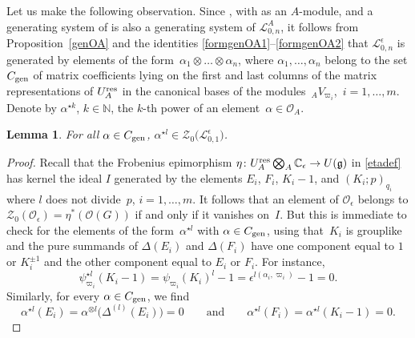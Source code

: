 \documentclass[pdftex]{sigma}
\numberwithin{equation}{section}
\newtheorem{lem}[teo]{Lemma}
\theoremstyle{definition}
\newcommand{\e}{\epsilon}
\newcommand{\mc}{\mathbb{C}}
\newcommand{\Ll}{{\mathcal L}}
\newcommand{\Oo}{{\mathcal O}}
\newcommand{\ra}{\rightarrow}
\begin{document}
Let us make the following observation. Since \smash{$\Ll_{0,n}^\e = \Ll_{0,n}^A \bigotimes_A \mc_\e$}, with \smash{$\Ll_{0,n}^A = \Oo_A^{\otimes n}$} as an $A$-module, and a generating system of \smash{$\Oo_A^{\otimes n}$} is also a generating system of $\Ll_{0,n}^A$, it follows from Proposition~\ref{genOA} and the identities \eqref{formgenOA1}--\eqref{formgenOA2} that $\Ll_{0,n}^\e$ is generated by elements of the form~${\alpha_1 \otimes \dots \otimes \alpha_n}$, where $\alpha_1,\dots , \alpha_n$ belong to the set $C_{\rm gen}$ of matrix coefficients lying on the first and last columns of the matrix representations of $U_A^{\rm res}$ in the canonical bases of the modules~${{}_AV_{\varpi_i}}$,~$i=1,\dots, m$. Denote by $\alpha^{\star k}$, $k\in \mathbb{N}$, the $k$-th power of an element~${\alpha\in \Oo_A}$.
\begin{lem} For all $\alpha\in C_{\rm gen}$, $\alpha^{\star l}\in \mathcal{Z}_0\bigl(\Ll_{0,1}^\e\bigr)$.
\end{lem}

\begin{proof} Recall that the Frobenius epimorphism $\eta\colon U_A^{\rm res} \bigotimes_A \mc_\e \ra U(\mathfrak{g})$ in \eqref{etadef} has kernel the ideal $I$ generated by the elements $E_i$, $F_i$, $K_i-1$, and $(K_i;p)_{q_i}$ where $l$ does not divide~$p$, ${i=1,\dots,m}$. It follows that an element of $\Oo_\e$ belongs to $\mathcal{Z}_0(\Oo_\e)=\eta^*(\Oo(G))$ if and only if it vanishes on~$I$. But this is immediate to check for the elements of the form~$\alpha^{\star l}$ with $\alpha\in C_{\rm gen}$, using that~$K_i$ is grouplike and the pure summands of $\Delta(E_i)$ and $\Delta(F_i)$ have one component equal to $1$ or $K_i^{\pm 1}$ and the other component equal to $E_i$ or $F_i$. For instance,
\[
\psi_{\varpi_i}^{\star l}(K_i-1) = \psi_{\varpi_i}(K_i)^l-1 = \e^{l(\alpha_i,\varpi_i)} - 1=0.
\]
 Similarly, for every $\alpha \in C_{\rm gen}$, we find
 \[
\alpha^{\star l}(E_i) =\alpha^{\otimes l}\big(\Delta^{(l)}(E_i)\big)=0 \qquad \text{and} \qquad \alpha^{\star l}(F_i)=\alpha^{\star l}(K_i-1)=0.\tag*{\qed}
\]\renewcommand{\qed}{}
\end{proof}
\end{document}
